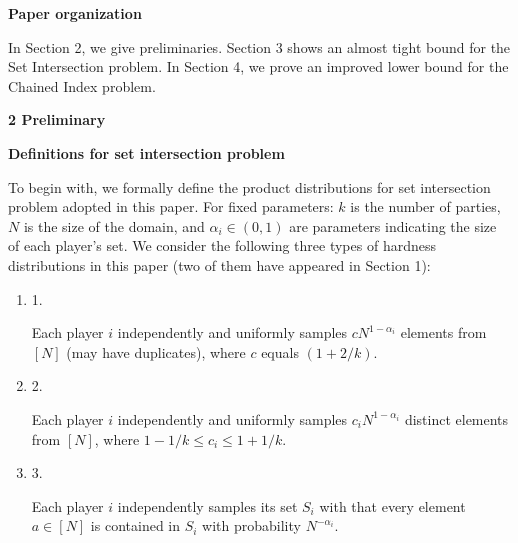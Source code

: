 \documentclass[10pt,a4paper]{article}
\begin{document}
\par\medskip\noindent\textbf{Paper organization}\par




In Section 2, we give preliminaries. Section 3 shows an almost tight bound for the Set Intersection problem. In Section 4, we prove an improved lower bound for the Chained Index problem.\par







\par\medskip\noindent\textbf{
2 Preliminary}\par




\par\medskip\noindent\textbf{Definitions for set intersection problem}\par




To begin with, we formally define the product distributions for set intersection problem adopted in this paper. For fixed parameters: $k$ is the number of parties, $N$ is the size of the domain, and $\alpha_{i}\in(0,1)$ are parameters indicating the size of each player’s set. We consider the following three types of hardness distributions in this paper (two of them have appeared in Section 1):\par


\begin{enumerate}


\item[] 
1. 


Each player $i$ independently and uniformly samples $cN^{1-\alpha_{i}}$ elements from $[N]$ (may have duplicates), where $c$ equals $(1+2/k)$.\par





\item[] 
2. 


Each player $i$ independently and uniformly samples $c_{i}N^{1-\alpha_{i}}$ distinct elements from $[N]$, where $1-1/k\leq c_{i}\leq 1+1/k$.\par





\item[] 
3. 


Each player $i$ independently samples its set $S_{i}$ with that every element $a\in[N]$ is contained in $S_{i}$ with probability $N^{-\alpha_{i}}$.\par





\end{enumerate}
\end{document}
